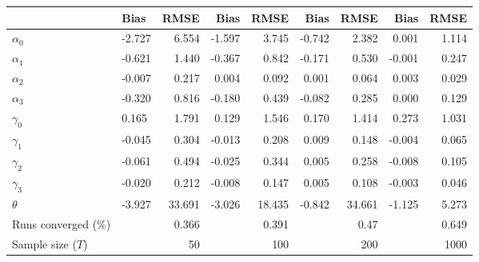 
\begin{tabular}[t]{llrrrrrrr}
\toprule
  & Bias & RMSE & Bias & RMSE & Bias & RMSE & Bias & RMSE\\
\midrule
$\alpha_{0}$ & -2.727 & 6.554 & -1.597 & 3.745 & -0.742 & 2.382 & 0.001 & 1.114\\
$\alpha_{1}$ & -0.621 & 1.440 & -0.367 & 0.842 & -0.171 & 0.530 & -0.001 & 0.247\\
$\alpha_{2}$ & -0.007 & 0.217 & 0.004 & 0.092 & 0.001 & 0.064 & 0.003 & 0.029\\
$\alpha_{3}$ & -0.320 & 0.816 & -0.180 & 0.439 & -0.082 & 0.285 & 0.000 & 0.129\\
$\gamma_{0}$ & 0.165 & 1.791 & 0.129 & 1.546 & 0.170 & 1.414 & 0.273 & 1.031\\
$\gamma_{1}$ & -0.045 & 0.304 & -0.013 & 0.208 & 0.009 & 0.148 & -0.004 & 0.065\\
$\gamma_{2}$ & -0.061 & 0.494 & -0.025 & 0.344 & 0.005 & 0.258 & -0.008 & 0.105\\
$\gamma_{3}$ & -0.020 & 0.212 & -0.008 & 0.147 & 0.005 & 0.108 & -0.003 & 0.046\\
$\theta$ & -3.927 & 33.691 & -3.026 & 18.435 & -0.842 & 34.661 & -1.125 & 5.273\\
Runs converged (\%) &  & 0.366 &  & 0.391 &  & 0.47 &  & 0.649\\
Sample size ($T$) &  & 50 &  & 100 &  & 200 &  & 1000\\
\bottomrule
\end{tabular}
